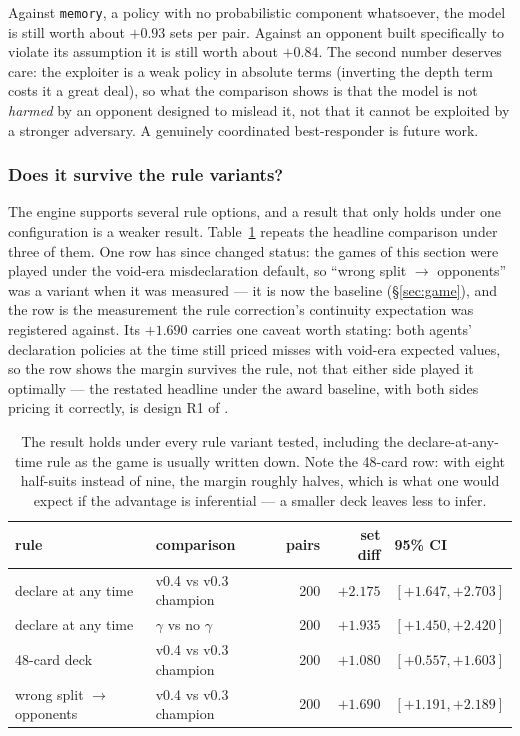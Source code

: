 \documentclass[11pt,letterpaper]{article}
\begin{document}
Against \texttt{memory}, a policy with no probabilistic component whatsoever,
the model is still worth about $+0.93$ sets per pair. Against an opponent built
specifically to violate its assumption it is still worth about $+0.84$. The
second number deserves care: the exploiter is a weak policy in absolute terms
(inverting the depth term costs it a great deal), so what the comparison shows
is that the model is not \emph{harmed} by an opponent designed to mislead it,
not that it cannot be exploited by a stronger adversary. A genuinely coordinated
best-responder is future work.

\subsubsection{Does it survive the rule variants?}
\label{sec:res-rules}

The engine supports several rule options, and a result that only holds under one
configuration is a weaker result. Table~\ref{tab:rules} repeats the headline
comparison under three of them. One row has since changed status: the games
of this section were played under the void-era misdeclaration default, so
``wrong split $\to$ opponents'' was a variant when it was measured --- it is
now the baseline (\S\ref{sec:game}), and the row is the measurement the rule
correction's continuity expectation was registered against. Its $+1.690$
carries one caveat worth stating: both agents' declaration policies at the
time still priced misses with void-era expected values, so the row shows the
margin survives the rule, not that either side played it optimally --- the
restated headline under the award baseline, with both sides pricing it
correctly, is design R1 of .

\begin{table}[t]
\centering
\small
\begin{tabular}{llrrl}
\toprule
rule & comparison & pairs & set diff & 95\% CI \\
\midrule
declare at any time & v0.4 vs v0.3 champion & 200 & $+2.175$ & $[+1.647, +2.703]$ \\
declare at any time & $\gamma$ vs no $\gamma$ & 200 & $+1.935$ & $[+1.450, +2.420]$ \\
48-card deck & v0.4 vs v0.3 champion & 200 & $+1.080$ & $[+0.557, +1.603]$ \\
wrong split $\to$ opponents & v0.4 vs v0.3 champion & 200 & $+1.690$ & $[+1.191, +2.189]$ \\
\bottomrule
\end{tabular}
\caption{The result holds under every rule variant tested, including the
declare-at-any-time rule as the game is usually written down. Note the 48-card
row: with eight half-suits instead of nine, the margin roughly halves, which is
what one would expect if the advantage is inferential --- a smaller deck leaves
less to infer.}
\label{tab:rules}
\end{table}
\end{document}
